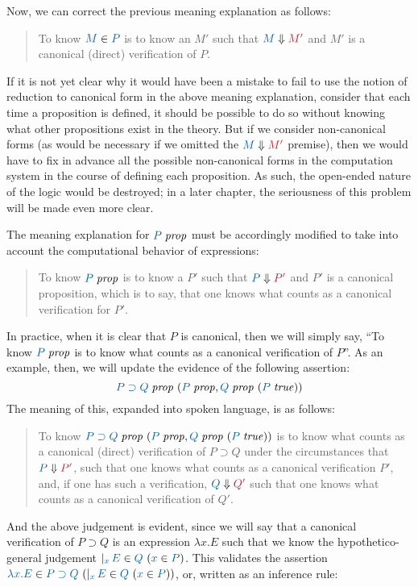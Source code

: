 Now, we can correct the previous meaning explanation as follows:

\begin{quote}
  To know $\ver{M}{P}$ is to know an $M'$ such that $\reduce{M}{M'}$ and $M'$ is a
  canonical (direct) verification of $P$.
\end{quote}

If it is not yet clear why it would have been a mistake to fail to use
the notion of reduction to canonical form in the above meaning
explanation, consider that each time a proposition is defined, it
should be possible to do so without knowing what other propositions
exist in the theory. But if we consider non-canonical forms (as would
be necessary if we omitted the $\reduce{M}{M'}$ premise), then we
would have to fix in advance all the possible non-canonical forms in
the computation system in the course of defining each proposition. As
such, the open-ended nature of the logic would be destroyed; in a
later chapter, the seriousness of this problem will be made even more
clear.


The meaning explanation for $\isprop{P}$ must be accordingly modified to take
into account the computational behavior of expressions:

\begin{quote}
  To know $\isprop{P}$ is to know a $P'$ such that $\reduce{P}{P'}$ and $P'$ is a
  canonical proposition, which is to say, that one knows what counts as a
  canonical verification for $P'$.
\end{quote}

In practice, when it is clear that $P$ is canonical, then we will simply say,
``To know $\isprop{P}$ is to know what counts as a canonical verification of
$P$''. As an example, then, we will update the evidence of the following assertion:
\[\hyp{\isprop{P\supset Q}}{\isprop{P},\hyp{\isprop{Q}}{\istrue{P}}}
\]
The meaning
of this, expanded into spoken language, is as follows:
\begin{quote}
  To know $\hyp{\isprop{P\supset
Q}}{\isprop{P},\hyp{\isprop{Q}}{\istrue{P}}}$ is to know what counts
  as a canonical (direct) verification of $P\supset Q$ under the
  circumstances that $\reduce{P}{P'}$, such that one knows what counts
  as a canonical verification $P'$, and, if one has such a verification,
  $\reduce{Q}{Q'}$ such that one knows what counts as a canonical
  verification of $Q'$.
\end{quote}

And the above judgement is evident, since we will say that a canonical
verification of $P\supset Q$ is an expression $\lambda x. E$ such that
we know the hypothetico-general judgement
$\genj{x}{\hyp{\ver{E}{Q}}{\ver{x}{P}}}$. This validates the assertion
$\hyp{\ver{\lambda x.E}{P\supset
Q}}{\genj{x}{\hyp{\ver{E}{Q}}{\ver{x}{P}}}}$, or, written as an
inference rule:

